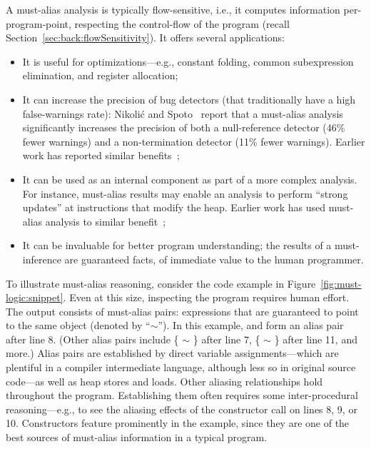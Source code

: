 A must-alias analysis is typically flow-sensitive, i.e., it computes information per-program-point, respecting the control-flow of the program (recall Section~\ref{sec:back:flowSensitivity}). It offers several applications:

\begin{itemize}
\item It is useful for optimizations---e.g., constant folding, common subexpression elimination, and register allocation;

\item It can increase the precision of bug detectors (that traditionally have a high false-warnings rate): Nikoli\'{c} and Spoto~\cite{ictac:2012:Nikolic} report that a must-alias analysis significantly increases the precision of both a null-reference detector (46\% fewer warnings) and a non-termination detector (11\% fewer warnings). Earlier work has reported similar benefits~\cite{isola:2008:Ma};

\item It can be used as an internal component as part of a more complex analysis. For instance, must-alias results may enable an analysis to perform ``strong updates'' at instructions that modify the heap. Earlier work has used must-alias analysis to similar benefit~\cite{pldi:1994:Emami,popl:1998:Jagannathan};

\item It can be invaluable for better program understanding; the results of a must-inference are guaranteed facts, of immediate value to the human programmer.
\end{itemize}

To illustrate must-alias reasoning, consider the code example in Figure~\ref{fig:must-logic:snippet}. Even at this size, inspecting the program requires human effort. The output consists of must-alias pairs: expressions that are guaranteed to point to the same object (denoted by ``$\sim$''). In this example,  and  form an alias pair after line 8. (Other alias pairs include \{ $\sim$ \} after line 7, \{ $\sim$ \} after line 11, and more.) Alias pairs are established by direct variable assignments---which are plentiful in a compiler intermediate language, although less so in original source code---as well as heap stores and loads. Other aliasing relationships hold throughout the program. Establishing them often requires some inter-procedural reasoning---e.g., to see the aliasing effects of the constructor call on lines 8, 9, or 10. Constructors feature prominently in the example, since they are one of the best sources of must-alias information in a typical program.

